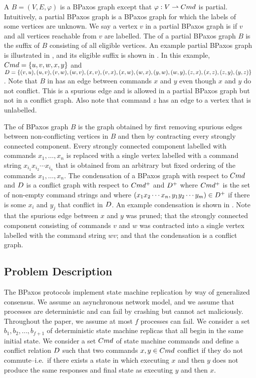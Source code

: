 A  $B = (V, E, \varphi)$ is a BPaxos graph except
that $\varphi: V \rightharpoonup Cmd$ is partial. Intuitively, a partial BPaxos
graph is a BPaxos graph for which the labels of some vertices are unknown.
%
We say a vertex $v$ in a partial BPaxos graph is  if $v$ and
all vertices reachable from $v$ are labelled. The  of
a partial BPaxos graph $B$ is the suffix of $B$ consisting of all eligible
vertices.
%
An example partial BPaxos graph is illustrated in ,
and its eligible suffix is shown in . In this example,
$Cmd = \{u, v, w, x, y\}$ and
  $D = \{
    (v, u), (u, v),
    (v, w), (w, v),
    (x, v), (v, x),
    (x, w), (w, x),
    (y, w), (w, y),
    (z, x), (x, z),
    (z, y), (y, z)
  \}$.
Note that $B$ in  has an edge between commands $x$
and $y$ even though $x$ and $y$ do not conflict. This is a spurious edge and is
allowed in a partial BPaxos graph but not in a conflict graph. Also note that
command $z$ has an edge to a vertex that is unlabelled.



The  of BPaxos graph $B$ is the graph obtained by first
removing spurious edges between non-conflicting vertices in $B$ and then by
contracting every strongly connected component. Every strongly connected
component labelled with commands $x_1, \ldots, x_n$ is replaced with a single
vertex labelled with a command string $x_{i_1} x_{i_2} \cdots x_{i_n}$ that is
obtained from an arbitrary but fixed ordering of the commands $x_1, \ldots,
x_n$.
%
The condensation of a BPaxos graph with respect to $Cmd$ and $D$ is
a conflict graph with respect to $Cmd^+$ and $D^+$ where $Cmd^+$ is
the set of non-empty command strings and where $(x_1 x_2 \cdots x_n, y_1 y_2
\cdots y_m) \in D^+$ if there is some $x_i$ and $y_j$ that conflict in
$D$.
%
An example condensation is shown in . Note that the
spurious edge between $x$ and $y$ was pruned; that the strongly connected
component consisting of commands $v$ and $w$ was contracted into a single
vertex labelled with the command string $wv$; and that the condensation is a
conflict graph.

\subsection{Problem Description}
The BPaxos protocols implement state machine replication by way of generalized
consensus. We assume an asynchronous network model, and we assume that
processes are deterministic and can fail by crashing but cannot act
maliciously. Throughout the paper, we assume at most $f$ processes can fail. We
consider a set $b_1, b_2, \ldots, b_{f+1}$ of deterministic state machine
replicas that all begin in the same initial state. We consider a set $Cmd$ of
state machine commands and define a conflict relation $D$ such that two
commands $x, y \in Cmd$ conflict if they do not commute--i.e.\ if there exists
a state in which executing $x$ and then $y$ does not produce the same responses
and final state as executing $y$ and then $x$.

